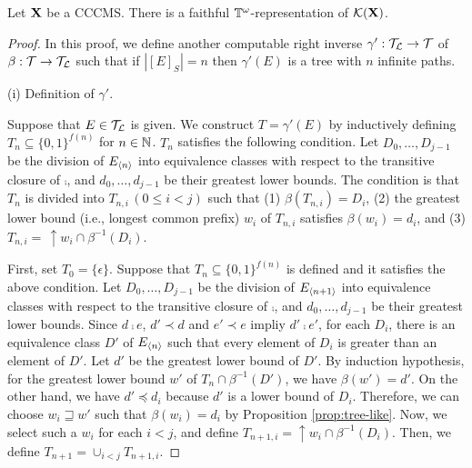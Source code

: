 \documentclass{eptcs-modified}
\begin{document}
\begin{theorem}\label{theo:minimalfaithful}
  Let $\mathbf{X}$ be a CCCMS. There is a faithful $\mathbb{T}^\omega$-representation of $\mathcal{K}(\mathbf{X})$.
\begin{proof}
  In this proof, we  define another computable right inverse $\gamma': \mathcal{T}_\mathcal{L} \to \mathcal{T}$ of $\beta: \mathcal{T} \to \mathcal{T}_\mathcal{L}$ such that if $|[E]_S| = n$ then $\gamma'(E)$ is a tree with $n$ infinite paths.





(i) Definition of $\gamma'$.

Suppose that $E \in \mathcal{T}_\mathcal{L}$ is given.  We construct $T = \gamma'(E)$ by
inductively defining $T_n \subseteq \{0,1\}^{f(n)}$ for $n \in \mathbb{N}$.
$T_n$ satisfies the following condition.
 Let $D_0, \ldots, D_{j-1}$ be the
division of ${{E_{{\langle n\rangle}}}}$ into equivalence classes with respect to the transitive closure of $\comp$,
and $d_0, \ldots, d_{j-1}$ be their greatest lower bounds.  The condition is that
$T_n$ is divided into  $T_{n,i}\,  (0 \leq i < j)$  such that (1) $\beta(T_{n,i}) = D_i$,
(2)  the greatest lower bound (i.e., longest common prefix) $w_i$ of $T_{n,i}$ satisfies
$\beta(w_i) = d_i$,   and (3) $T_{n,i}  =\, \uparrow\! w_i \cap \beta^{-1}(D_i)$.



First, set $T_0 = \{\epsilon\}$.  Suppose that $T_n \subseteq \{0,1\}^{f(n)}$ is defined and it satisfies the above condition.  Let $D_0, \ldots, D_{j-1}$ be the division of
${{E_{{\langle n+1\rangle}}}}$ into equivalence classes with respect to the transitive closure of $\comp$, and
  $d_0, \ldots, d_{j-1}$ be their greatest lower bounds.  Since $d \comp e$, $d' \prec d$ and
  $e' \prec e$ impliy $d' \comp e'$, for each $D_i$, there is an equivalence class $D'$ of ${{E_{{\langle n\rangle}}}}$
  such that every element of $D_i$ is greater than an element of $D'$.
Let $d'$ be the greatest lower
  bound of $D'$. By induction hypothesis, for the greatest lower bound $w'$ of $T_n \cap \beta^{-1}(D')$, we have $\beta(w') = d'$.  On the other hand, we have $d' \preceq d_i$ because $d'$ is a lower bound
  of $D_i$.  Therefore, we can choose $w_i\sqsupseteq w'$
such that $\beta(w_i) = d_i$ by Proposition \ref{prop:tree-like}.
Now, we select such a $w_i$ for each $i < j$, and
define $T_{n+1, i} = \uparrow\! w_i \cap \beta^{-1}(D_i)$.  Then, we define
$T_{n+1} = \cup_{i < j}  T_{n+1, i}$.


\end{proof}
\end{theorem}
\end{document}
